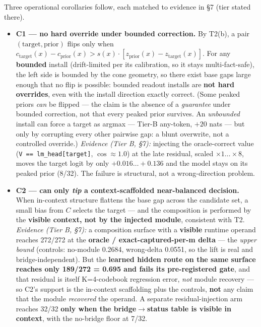 \documentclass[11pt]{article}
\theoremstyle{plain}
\theoremstyle{definition}
\begin{document}
Three operational corollaries follow, each matched to evidence in \S7 (tier stated there).

\begin{itemize}
\item \textbf{C1 --- no hard override under bounded correction.} By T2(b), a pair $(\mathrm{target}, \mathrm{prior})$ flips only when $c_{\mathrm{target}}(x) - c_{\mathrm{prior}}(x) > s(x)\cdot[z_{\mathrm{prior}}(x) - z_{\mathrm{target}}(x)]$. For any \textbf{bounded} install (drift-limited per its calibration, so it stays multi-fact-safe), the left side is bounded by the cone geometry, so there exist base gaps large enough that no flip is possible: bounded readout installs are \textbf{not hard overrides}, even with the install direction exactly correct. (Some peaked priors \emph{can} be flipped --- the claim is the absence of a \emph{guarantee} under bounded correction, not that every peaked prior survives. An \emph{unbounded} install can force a target as argmax --- Tier-B any-token, $+20$ nats --- but only by corrupting every other pairwise gap: a blunt overwrite, not a controlled override.) \emph{Evidence (Tier B, \S7):} injecting the oracle-correct value (\texttt{V == lm\_head[target]}, $\cos \approx 1.0$) at the late residual, scaled $\times 1\dots\times 8$, moves the target logit by only \textbf{$+0.016\dots+0.136$} and the model stays on its peaked prior (8/32). The failure is structural, not a wrong-direction problem.

\item \textbf{C2 --- can only \emph{tip} a context-scaffolded near-balanced decision.} When in-context structure flattens the base gap across the candidate set, a small bias from $C$ selects the target --- and the composition is performed by the \textbf{visible context, not by the injected module}, consistent with T2. \emph{Evidence (Tier B, \S7):} a composition surface with a \textbf{visible} runtime operand reaches 272/272 at the \textbf{oracle / exact-captured-per-m delta} --- the \emph{upper bound} (controls: no-module 0.2684, wrong-delta 0.0551, so the lift is real and bridge-independent). But the \textbf{learned hidden route on the same surface reaches only 189/272 = 0.695 and fails its pre-registered gate}, and that residual is itself K=4-codebook regression error, \emph{not} module recovery --- so C2's support is the in-context scaffolding plus the controls, \textbf{not} any claim that the module \emph{recovered} the operand. A separate residual-injection arm reaches 32/32 \textbf{only when the bridge$\to$status table is visible in context}, with the no-bridge floor at 7/32.


\end{itemize}
\end{document}
